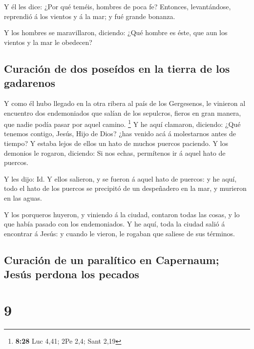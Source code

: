  Y él les dice: ¿Por qué teméis, hombres de poca fe?
Entonces, levantándose, reprendió á los vientos y á la mar; y fué grande
bonanza.

 Y los hombres se maravillaron, diciendo: ¿Qué hombre es
éste, que aun los vientos y la mar le obedecen?

\hypertarget{curaciuxf3n-de-dos-poseuxeddos-en-la-tierra-de-los-gadarenos}{%
\subsection{Curación de dos poseídos en la tierra de los
gadarenos}\label{curaciuxf3n-de-dos-poseuxeddos-en-la-tierra-de-los-gadarenos}}

 Y como él hubo llegado en la otra ribera al país de los
Gergesenos, le vinieron al encuentro dos endemoniados que salían de los
sepulcros, fieros en gran manera, que nadie podía pasar por aquel
camino. \footnote{\textbf{8:28} Luc 4,41; 2Pe 2,4; Sant 2,19}
 Y he aquí clamaron, diciendo: ¿Qué tenemos contigo, Jesús,
Hijo de Dios? ¿has venido acá á molestarnos antes de tiempo?
 Y estaba lejos de ellos un hato de muchos puercos
paciendo.  Y los demonios le rogaron, diciendo: Si nos
echas, permítenos ir á aquel hato de puercos.

 Y les dijo: Id. Y ellos salieron, y se fueron á aquel hato
de puercos: y he aquí, todo el hato de los puercos se precipitó de un
despeñadero en la mar, y murieron en las aguas.

 Y los porqueros huyeron, y viniendo á la ciudad, contaron
todas las cosas, y lo que había pasado con los endemoniados.
 Y he aquí, toda la ciudad salió á encontrar á Jesús: y
cuando le vieron, le rogaban que saliese de sus términos.

\hypertarget{curaciuxf3n-de-un-paraluxedtico-en-capernaum-jesuxfas-perdona-los-pecados}{%
\subsection{Curación de un paralítico en Capernaum; Jesús perdona los
pecados}\label{curaciuxf3n-de-un-paraluxedtico-en-capernaum-jesuxfas-perdona-los-pecados}}

\hypertarget{section-8}{%
\section{9}\label{section-8}}

